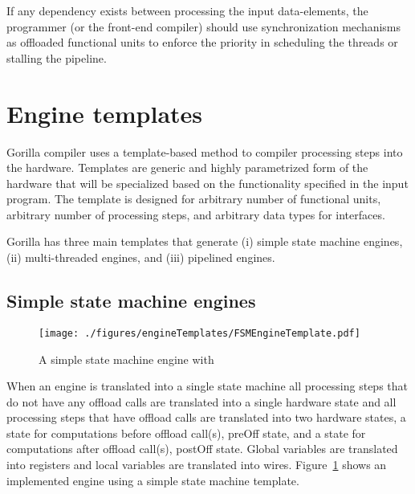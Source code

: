 \documentclass[a4paper, 12pt]{report}
\begin{document}
If any dependency exists between processing 
the input data-elements, the programmer (or the 
front-end compiler) should use synchronization 
mechanisms as offloaded functional units to enforce 
the priority in scheduling the threads or stalling 
the pipeline.

\section{Engine templates}
\label{sec:engineCompiler}
Gorilla compiler uses a template-based method 
to compiler processing steps into the hardware.
Templates are generic and highly parametrized 
form of the hardware that will be specialized 
based on the functionality specified in the input 
program. The template is designed for arbitrary 
number of functional units, arbitrary number of 
processing steps, and arbitrary data types for 
interfaces. 

Gorilla has three main templates that generate 
(i) simple state machine engines, (ii) multi-threaded 
engines, and (iii) pipelined engines.

\subsection{Simple state machine engines}
\begin{figure}
\begin{center}
  \texttt{[image: ./figures/engineTemplates/FSMEngineTemplate.pdf]}
  \caption{A simple state machine engine with}
  \label{fig:FSMtemplate}
\end{center}
\end{figure}
When an engine is translated into a single state machine 
all processing steps that do not have any offload calls 
are translated into a single hardware state and all processing 
steps that have offload calls are translated into two hardware 
states, a state for computations before offload call(s), preOff 
state, and a state for computations after offload call(s), 
postOff state. Global variables are translated into registers 
and local variables are translated into wires. Figure~\ref{fig:FSMtemplate} 
shows an implemented engine using a simple state machine template.
\end{document}
